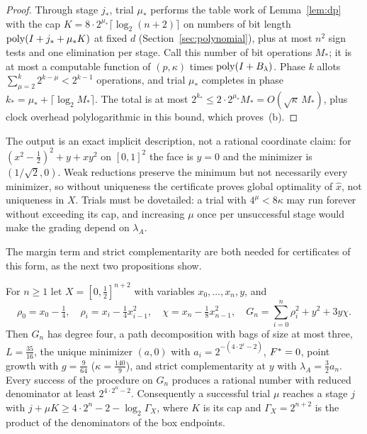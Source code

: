 \begin{proof}
Through stage $j_*$, trial $\mu_*$ performs the table work of
Lemma~\ref{lem:dp} with the cap $K=8\cdot2^{\mu_*}\lceil\log_2(n+2)\rceil$ on
numbers of bit length $\operatorname{poly}(I+j_*+\mu_*K)$ at fixed $d$
(Section~\ref{sec:polynomial}), plus at most $n^2$ sign tests and one
elimination per stage. Call this number of bit operations $M_*$; it is at
most a computable function of $(p,\kappa)$ times $\operatorname{poly}(I+B_\lambda)$. Phase
$k$ allots $\sum_{\mu=2}^k2^{k-\mu}<2^{k-1}$ operations, and trial $\mu_*$
completes in phase $k_*=\mu_*+\lceil\log_2M_*\rceil$. The total is at most
$2^{k_*}\le2\cdot2^{\mu_*}M_*=O(\sqrt\kappa\,M_*)$, plus clock overhead
polylogarithmic in this bound, which proves~(b).
\end{proof}

The output is an exact implicit description, not a rational coordinate claim:
for $(x^2-\frac12)^2+y+xy^2$ on $[0,1]^2$ the face is $y=0$ and the minimizer
is $(1/\sqrt2,0)$. Weak reductions preserve the minimum but not necessarily
every minimizer, so without uniqueness the certificate proves global
optimality of $\hat x$, not uniqueness in $X$. Trials must be dovetailed: a
trial with $4^\mu<8\kappa$ may run forever without exceeding its cap, and
increasing $\mu$ once per unsuccessful stage would make the grading depend on
$\lambda_A$.

The margin term and strict complementarity are both needed for certificates
of this form, as the next two propositions show.

\begin{proposition}\label{prop:margin}
For $n\ge1$ let $X=[0,\frac12]^{n+2}$ with variables $x_0,\ldots,x_n,y$, and
\[
\rho_0=x_0-\tfrac14,\quad \rho_i=x_i-\tfrac14x_{i-1}^2,\quad
\chi=x_n-\tfrac18x_{n-1}^2,\quad
G_n=\sum_{i=0}^n\rho_i^2+y^2+3y\chi.
\]
Then $G_n$ has degree four, a path decomposition with bags of size at most
three, $L=\frac{35}{16}$, the unique minimizer $(a,0)$ with
$a_i=2^{-(4\cdot2^i-2)}$, $F^{*}=0$, point growth with $g=\frac9{64}$
($\kappa=\frac{140}9$), and strict complementarity at $y$ with
$\lambda_A=\frac32a_n$. Every success of the procedure on $G_n$ produces a
rational number with reduced denominator at least $2^{4\cdot2^n-2}$.
Consequently a successful trial $\mu$ reaches a stage $j$ with
$j+\mu K\ge4\cdot2^n-2-\log_2\Gamma_X$, where $K$ is its cap and
$\Gamma_X=2^{n+2}$ is the product of the denominators of the box endpoints.
\end{proposition}

